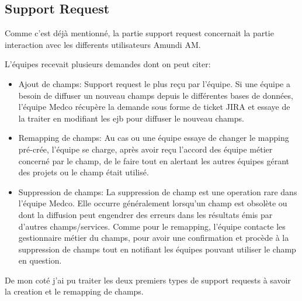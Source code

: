\subsection{Support Request}
\par Comme c'est déjà mentionné, la partie support request concernait la partie interaction avec les differents utilisateurs Amundi AM. 
\par L'équipes recevait plusieurs demandes dont on peut citer: \\
\begin{itemize}
    \item Ajout de champs: Support request le plus reçu par l'équipe. Si une équipe a besoin de diffuser un nouveau champs depuis le différentes bases de données, l'équipe Medco récupère la demande sous forme de ticket JIRA et essaye de la traiter en modifiant les ejb pour diffuser le nouveau champs.
    \item Remapping de champs: Au cas ou une équipe essaye de changer le mapping pré-crée, l'équipe se charge, après avoir reçu l'accord des équipe métier concerné par le champ, de le faire tout en alertant les autres équipes gérant des projets ou le champ était utilisé. 
    \item Suppression de champs: La suppression de champ est une operation rare dans l'équipe Medco. Elle occurre généralement lorsqu'un champ est obsolète ou dont la diffusion peut engendrer des erreurs dans les résultats émis par d'autres champs/services. Comme pour le remapping, l'équipe contacte les gestionnaire métier du champs, pour avoir une confirmation et procède à la suppression de champs tout en notifiant les équipes pouvant utiliser le champ en question.
\end{itemize}
\par De mon coté j'ai pu traiter les deux premiers types de support requests à savoir la creation et le remapping de champs. 

